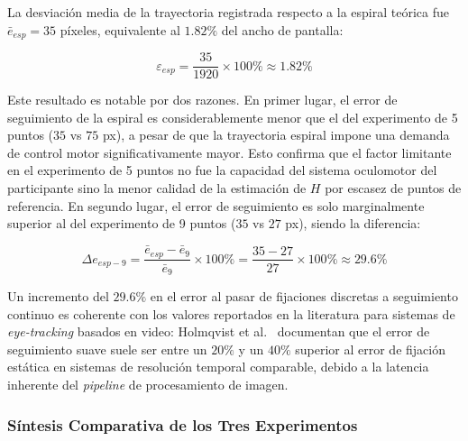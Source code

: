 La desviación media de la trayectoria registrada respecto a la espiral
teórica fue $\bar{e}_{esp} = 35$ píxeles, equivalente al $1.82\%$ del
ancho de pantalla:

\begin{equation}
	\varepsilon_{esp} = \frac{35}{1920} \times 100\% \approx 1.82\%
	\label{eq:error_espiral}
\end{equation}

Este resultado es notable por dos razones.
En primer lugar, el error de
seguimiento de la espiral es considerablemente menor que el del
experimento de 5 puntos ($35$ vs $75$ px), a pesar de que la trayectoria
espiral impone una demanda de control motor significativamente mayor.
Esto confirma que el factor limitante en el experimento de 5 puntos no
fue la capacidad del sistema oculomotor del participante sino la menor
calidad de la estimación de $H$ por escasez de puntos de referencia.
En segundo lugar, el error de seguimiento es solo marginalmente superior
al del experimento de 9 puntos ($35$ vs $27$ px), siendo la diferencia:

\begin{equation}
	\Delta e_{esp-9} = \frac{\bar{e}_{esp} - \bar{e}_9}{\bar{e}_9}
	\times 100\% = \frac{35 - 27}{27} \times 100\% \approx 29.6\%
	\label{eq:degradacion_esp_9}
\end{equation}

Un incremento del $29.6\%$ en el error al pasar de fijaciones discretas
a seguimiento continuo es coherente con los valores reportados en la
literatura para sistemas de \textit{eye-tracking} basados en video: Holmqvist
et al.\ \cite{holmqvist2011eye} documentan que el error de seguimiento
suave suele ser entre un $20\%$ y un $40\%$ superior al error de
fijación estática en sistemas de resolución temporal comparable, debido
a la latencia inherente del \textit{pipeline} de 
procesamiento de imagen.

\subsubsection{Síntesis Comparativa de los Tres Experimentos}

